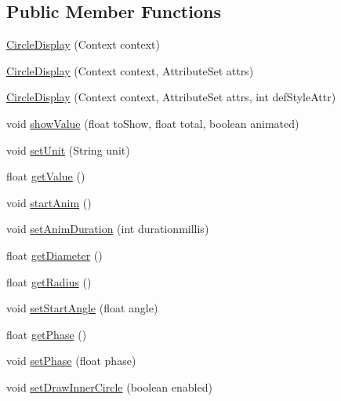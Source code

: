 \subsection*{Public Member Functions}
\begin{DoxyCompactItemize}
\item 
\hyperlink{classcs_1_1usense_1_1_circle_display_a1eb75f9b9885a4e1e12e433b15711e2d}{Circle\+Display} (Context context)
\item 
\hyperlink{classcs_1_1usense_1_1_circle_display_ad9e80f7e09a57ecc1bb56bb9bc3db947}{Circle\+Display} (Context context, Attribute\+Set attrs)
\item 
\hyperlink{classcs_1_1usense_1_1_circle_display_af2cfdbeb33a54c97f2706cbd09709b78}{Circle\+Display} (Context context, Attribute\+Set attrs, int def\+Style\+Attr)
\item 
void \hyperlink{classcs_1_1usense_1_1_circle_display_a6614c6cbaec2fa361011708813f76bef}{show\+Value} (float to\+Show, float total, boolean animated)
\item 
void \hyperlink{classcs_1_1usense_1_1_circle_display_ab31e3862c891fedeab110c438538b66b}{set\+Unit} (String unit)
\item 
float \hyperlink{classcs_1_1usense_1_1_circle_display_af5ef411cb9864f378c447903fe205333}{get\+Value} ()
\item 
void \hyperlink{classcs_1_1usense_1_1_circle_display_a52c2496f1642af80d374b2b939a452d7}{start\+Anim} ()
\item 
void \hyperlink{classcs_1_1usense_1_1_circle_display_a07e741f218b2f5c468642d5d158f20cd}{set\+Anim\+Duration} (int durationmillis)
\item 
float \hyperlink{classcs_1_1usense_1_1_circle_display_ab565639ce7326fbfa301b786bb7dd41b}{get\+Diameter} ()
\item 
float \hyperlink{classcs_1_1usense_1_1_circle_display_a8a428774e629f0722822155329d1969b}{get\+Radius} ()
\item 
void \hyperlink{classcs_1_1usense_1_1_circle_display_a58dabbbcfe58cf8786cfce038ef56edc}{set\+Start\+Angle} (float angle)
\item 
float \hyperlink{classcs_1_1usense_1_1_circle_display_afef76cef3c66316d4ca4d951033c728b}{get\+Phase} ()
\item 
void \hyperlink{classcs_1_1usense_1_1_circle_display_a20c7f31512490302d98f73d5e051a181}{set\+Phase} (float phase)
\item 
void \hyperlink{classcs_1_1usense_1_1_circle_display_a3bc62d4b635852283351b952f73ac923}{set\+Draw\+Inner\+Circle} (boolean enabled)

\end{DoxyCompactItemize}
